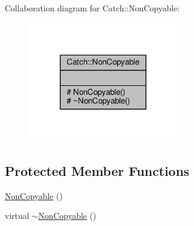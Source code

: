 Collaboration diagram for Catch\-:\-:Non\-Copyable\-:
\nopagebreak
\begin{figure}[H]
\begin{center}
\leavevmode
\includegraphics[width=188pt]{class_catch_1_1_non_copyable__coll__graph}
\end{center}
\end{figure}
\subsection*{Protected Member Functions}
\begin{DoxyCompactItemize}
\item 
\hyperlink{class_catch_1_1_non_copyable_a4b492dd5753f9952350fb64dc6cb9fe2}{Non\-Copyable} ()
\item 
virtual \hyperlink{class_catch_1_1_non_copyable_a81254677280fef337eb4a676e91e3293}{$\sim$\-Non\-Copyable} ()
\end{DoxyCompactItemize}


